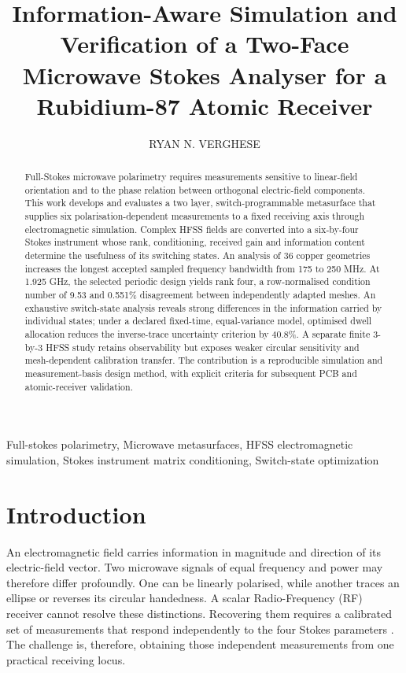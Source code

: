 \documentclass{ieeeaccess}
\begin{document}
\doi{}
\history{}
\vol{--}
\year{--}
\title{Information-Aware Simulation and Verification of a Two-Face Microwave Stokes Analyser for a Rubidium-87 Atomic Receiver}
\author{\uppercase{Ryan N. Verghese}}
\address[1]{School of Engineering and Technology, University of New South Wales, Canberra, ACT, Australia}
\begin{abstract}
Full-Stokes microwave polarimetry requires measurements sensitive to linear-field orientation and to the phase relation between orthogonal electric-field components. This work develops and evaluates a two layer, switch-programmable metasurface that supplies six polarisation-dependent measurements to a fixed receiving axis through electromagnetic simulation. Complex HFSS fields are converted into a six-by-four Stokes instrument whose rank, conditioning, received gain and information content determine the usefulness of its switching states. An analysis of 36 copper geometries increases the longest accepted sampled frequency bandwidth from 175 to 250 MHz. At 1.925 GHz, the selected periodic design yields rank four, a row-normalised condition number of 9.53 and 0.551\% disagreement between independently adapted meshes. An exhaustive switch-state analysis reveals strong differences in the information carried by individual states; under a declared fixed-time, equal-variance model, optimised dwell allocation reduces the inverse-trace uncertainty criterion by 40.8\%. A separate finite 3-by-3 HFSS study retains observability but exposes weaker circular sensitivity and mesh-dependent calibration transfer. The contribution is a reproducible simulation and measurement-basis design method, with explicit criteria for subsequent PCB and atomic-receiver validation.
\end{abstract}

\begin{keywords}
Full-stokes polarimetry, Microwave metasurfaces, HFSS electromagnetic simulation, Stokes instrument matrix conditioning, Switch-state optimization
\end{keywords}
\titlepgskip=-21pt
\maketitle
\section{Introduction}
An electromagnetic field carries information in magnitude and direction of its electric-field vector. Two microwave signals of equal frequency and power may therefore differ profoundly. One can be linearly polarised, while another traces an ellipse or reverses its circular handedness. A scalar Radio-Frequency (RF) receiver cannot resolve these distinctions. Recovering them requires a calibrated set of measurements that respond independently to the four Stokes parameters \cite{Azzam1988,Tyo2002,Goldstein2011}. The challenge is, therefore, obtaining those independent measurements from one practical receiving locus.
\end{document}

